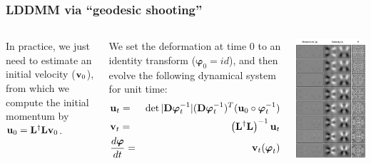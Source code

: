 \begin{frame}
\frametitle{LDDMM via ``geodesic shooting''}
\begin{columns}[c]
In practice, we just need to estimate an initial velocity (${\bf v}_0$), from which we compute the initial momentum by ${\bf u}_0 = {\bf L}^{\dagger}{\bf L}{\bf v}_0$.

We set the deformation at time 0 to an identity transform (${\boldsymbol\varphi}_0 = id$), and then evolve the following dynamical system for unit time:
\begin{eqnarray*}
&{\bf u}_{t} = & \det |{\bf D}{\boldsymbol\varphi}_{t}^{-1}| ({\bf D}{\boldsymbol\varphi}_{t}^{-1})^T ({\bf u}_{0} \circ {\boldsymbol\varphi}_{t}^{-1})\cr
&{\bf v}_{t} = & \left({\bf L}^{\dagger}{\bf L}\right)^{-1} {\bf u}_t\cr
&\frac{d {\boldsymbol\varphi}}{d t} = & {\bf v}_t ({\boldsymbol\varphi}_t)
\end{eqnarray*}
\begin{center}
\includegraphics[width=1\textwidth]{evolution1}

\end{center}
\end{columns}
\end{frame}
